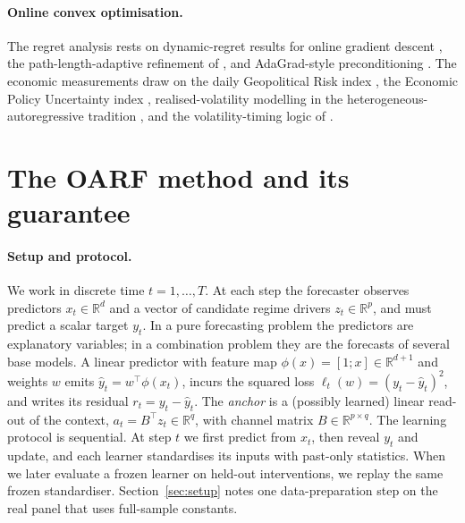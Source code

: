 \documentclass[11pt]{article}
\theoremstyle{plain}
\theoremstyle{remark}
\newcommand{\R}{\mathbb{R}}
\begin{document}
\paragraph{Online convex optimisation.} The regret analysis rests on dynamic-regret
results for online gradient descent \citep{zinkevich2003ogd,hazan2016oco}, the
path-length-adaptive refinement of \citet{zhang2018adaptive}, and AdaGrad-style
preconditioning \citep{duchi2011adagrad}. The economic measurements draw on the
daily Geopolitical Risk index \citep{caldara2022gpr}, the Economic Policy
Uncertainty index \citep{baker2016epu}, realised-volatility modelling in the
heterogeneous-autoregressive tradition \citep{corsi2009har}, and the
volatility-timing logic of \citet{fleming2001voltiming}.

\section{The OARF method and its guarantee}\label{sec:method}

\paragraph{Setup and protocol.}
We work in discrete time $t=1,\dots,T$. At each step the forecaster observes
predictors $x_t\in\R^d$ and a vector of candidate regime drivers $z_t\in\R^p$, and
must predict a scalar target $y_t$. In a pure forecasting problem the predictors are
explanatory variables; in a combination problem they are the forecasts of several
base models. A linear predictor with feature map
$\phi(x)=[1;x]\in\R^{d+1}$ and weights $w$ emits $\hat y_t=w^\top\phi(x_t)$, incurs
the squared loss $\ell_t(w)=(y_t-\hat y_t)^2$, and writes its residual
$r_t=y_t-\hat y_t$. The \emph{anchor} is a (possibly learned) linear read-out of the
context, $a_t=B^\top z_t\in\R^q$, with channel matrix $B\in\R^{p\times q}$. The learning protocol is sequential. At step $t$ we first predict from $x_t$, then reveal $y_t$ and update, and each learner standardises its inputs with past-only statistics. When we later evaluate a frozen learner on held-out interventions, we replay the same frozen standardiser. Section~\ref{sec:setup} notes one data-preparation step on the real panel that uses full-sample constants.
\end{document}
